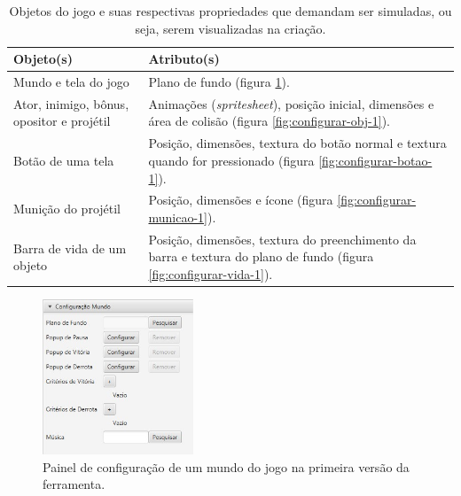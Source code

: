 \documentclass[12pt,oneside,openright,a4paper,english,brazil,sumario=tradicional]{abntex2}
\begin{document}
\begin{table}[h]
   \centering
   \begin{tabular}{| p{6cm} | p{9cm} |}
      \hline
      \textbf{Objeto(s)} & \textbf{Atributo(s)} \\
      \hline
      Mundo e tela do jogo & Plano de fundo (figura \ref{fig:configurar-mundo-1}).\\
      \hline
      Ator, inimigo, bônus, opositor e projétil & Animações (\emph{spritesheet}), posição inicial, dimensões e área de colisão (figura \ref{fig:configurar-obj-1}). \\
      \hline
      Botão de uma tela & Posição, dimensões, textura do botão normal e textura quando for pressionado (figura \ref{fig:configurar-botao-1}).\\
      \hline
      Munição do projétil & Posição, dimensões e ícone (figura \ref{fig:configurar-municao-1}). \\
      \hline
      Barra de vida de um objeto & Posição, dimensões, textura do preenchimento da barra e textura do plano de fundo (figura \ref{fig:configurar-vida-1}). \\
      \hline
   \end{tabular}
   \caption{Objetos do jogo e suas respectivas propriedades que demandam ser simuladas, ou seja, serem visualizadas na criação.}
   \label{table:objetos-atributos}
\end{table}
\begin{figure}[h]
\centering
\includegraphics[width=0.4\textwidth]{images/configurar-mundo-1.jpg}
\caption{Painel de configuração de um mundo do jogo na primeira versão da ferramenta.}
\label{fig:configurar-mundo-1}
\end{figure}
\end{document}
